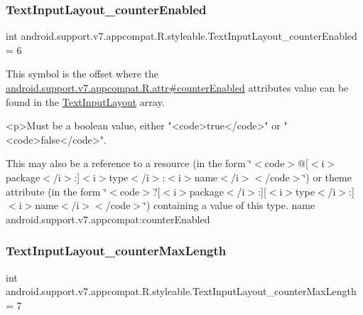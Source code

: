 \subsubsection{\texorpdfstring{Text\+Input\+Layout\+\_\+counter\+Enabled}{TextInputLayout\_counterEnabled}}
{\footnotesize\ttfamily int android.\+support.\+v7.\+appcompat.\+R.\+styleable.\+Text\+Input\+Layout\+\_\+counter\+Enabled = 6\hspace{0.3cm}{\ttfamily [static]}}

This symbol is the offset where the \hyperlink{classandroid_1_1support_1_1v7_1_1appcompat_1_1R_1_1attr_a511b4c603ffb630488d846e3e750d2eb}{android.\+support.\+v7.\+appcompat.\+R.\+attr\#counter\+Enabled} attribute\textquotesingle{}s value can be found in the \hyperlink{classandroid_1_1support_1_1v7_1_1appcompat_1_1R_1_1styleable_a618db13ebe8aab96f9d951a0d1c7d5bc}{Text\+Input\+Layout} array.

\begin{DoxyVerb}      <p>Must be a boolean value, either "<code>true</code>" or "<code>false</code>".
\end{DoxyVerb}
 

This may also be a reference to a resource (in the form \char`\"{}$<$code$>$@\mbox{[}$<$i$>$package$<$/i$>$\+:\mbox{]}$<$i$>$type$<$/i$>$\+:$<$i$>$name$<$/i$>$$<$/code$>$\char`\"{}) or theme attribute (in the form \char`\"{}$<$code$>$?\mbox{[}$<$i$>$package$<$/i$>$\+:\mbox{]}\mbox{[}$<$i$>$type$<$/i$>$\+:\mbox{]}$<$i$>$name$<$/i$>$$<$/code$>$\char`\"{}) containing a value of this type.  name android.\+support.\+v7.\+appcompat\+:counter\+Enabled \mbox{\label{classandroid_1_1support_1_1v7_1_1appcompat_1_1R_1_1styleable_a793c82374695417c1f4d0a1417cbcacc}} 
\subsubsection{\texorpdfstring{Text\+Input\+Layout\+\_\+counter\+Max\+Length}{TextInputLayout\_counterMaxLength}}
{\footnotesize\ttfamily int android.\+support.\+v7.\+appcompat.\+R.\+styleable.\+Text\+Input\+Layout\+\_\+counter\+Max\+Length = 7\hspace{0.3cm}{\ttfamily [static]}}


